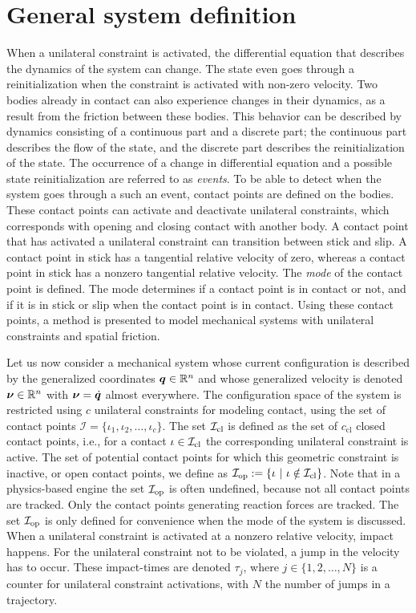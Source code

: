 \documentclass[../DC2017114Bouma.tex]{subfiles}
\begin{document}
\section{General system definition}
When a unilateral constraint is activated, the differential equation that describes the dynamics of the system can change. The state even goes through a reinitialization when the constraint is activated with non-zero velocity. Two bodies already in contact can also experience changes in their dynamics, as a result from the friction between these bodies. This behavior can be described by dynamics consisting of a continuous part and a discrete part; the continuous part describes the flow of the state, and the discrete part describes the reinitialization of the state. The occurrence of a change in differential equation and a possible state reinitialization are referred to as \textit{events}. To be able to detect when the system goes through a such an event, contact points are defined on the bodies. These contact points can activate and deactivate unilateral constraints, which corresponds with opening and closing contact with another body. A contact point that has activated a unilateral constraint can transition between stick and slip. A contact point in stick has a tangential relative velocity of zero, whereas a contact point in stick has a nonzero tangential relative velocity. The \textit{mode} of the contact point is defined. The mode determines if a contact point is in contact or not, and if it is in stick or slip when the contact point is in contact. Using these contact points, a method is presented to model mechanical systems with unilateral constraints and spatial friction. 

Let us now consider a mechanical system whose current configuration is described by the generalized coordinates ${\boldsymbol{q}}\in\mathbb{R}^n$ and whose generalized velocity is denoted $\boldsymbol{\nu}\in\mathbb{R}^n$ with $\boldsymbol{\nu}=\dot{{\boldsymbol{q}}}$ almost everywhere. The configuration space of the system is restricted using $c$ unilateral constraints for modeling contact, using the set of contact points $\mathcal{I}=\{\iota_1,\iota_2,\dots,\iota_c\}$. The set $\mathcal{I}_{\text{cl}}$ is defined as the set of $c_{\text{cl}}$ closed contact points, i.e., for a contact $\iota\in\mathcal{I}_{\text{cl}}$ the corresponding unilateral constraint is active. The set of potential contact points for which this geometric constraint is inactive, or open contact points, we define as $\Ic_{\text{op}} := \{\iota\ |\ \iota\notin\Ic_{\text{cl}}\}$. Note that in a physics-based engine the set $\mathcal{I}_{\text{op}}$ is often undefined, because not all contact points are tracked. Only the contact points generating reaction forces are tracked. The set $\mathcal{I}_{\text{op}}$ is only defined for convenience when the mode of the system is discussed. When a unilateral constraint is activated at a nonzero relative velocity, impact happens. For the unilateral constraint not to be violated, a jump in the velocity has to occur. These impact-times are denoted $\tau_j$, where $j\in \{1,2,\dots,N\}$ is a counter for unilateral constraint activations, with $N$ the number of jumps in a trajectory.
\end{document}
